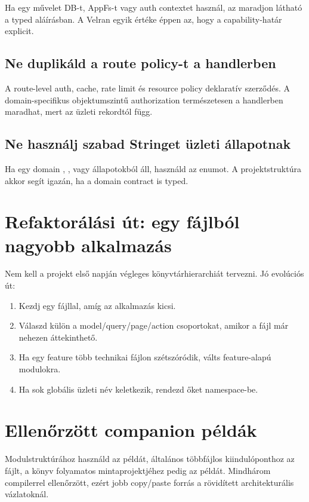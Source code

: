 Ha egy művelet DB-t, AppFs-t vagy auth contextet használ, az maradjon látható a typed aláírásban. A Velran egyik értéke éppen az, hogy a capability-határ explicit.

\subsection*{Ne duplikáld a route policy-t a handlerben}

A route-level auth, cache, rate limit és resource policy deklaratív szerződés. A domain-specifikus objektumszintű authorization természetesen a handlerben maradhat, mert az üzleti rekordtól függ.

\subsection*{Ne használj szabad Stringet üzleti állapotnak}

Ha egy domain , ,  vagy  állapotokból áll, használd az enumot. A projektstruktúra akkor segít igazán, ha a domain contract is typed.

\section{Refaktorálási út: egy fájlból nagyobb alkalmazás}

Nem kell a projekt első napján végleges könyvtárhierarchiát tervezni. Jó evolúciós út:

\begin{enumerate}
  \item Kezdj egy  fájllal, amíg az alkalmazás kicsi.
  \item Válaszd külön a model/query/page/action csoportokat, amikor a fájl már nehezen áttekinthető.
  \item Ha egy feature több technikai fájlon szétszóródik, válts feature-alapú modulokra.
  \item Ha sok globális üzleti név keletkezik, rendezd őket  namespace-be.
\end{enumerate}

\section{Ellenőrzött companion példák}
Modulstruktúrához használd az  példát, általános többfájlos kiindulóponthoz az  fájlt, a könyv folyamatos mintaprojektjéhez pedig az  példát. Mindhárom compilerrel ellenőrzött, ezért jobb copy/paste forrás a rövidített architekturális vázlatoknál.

